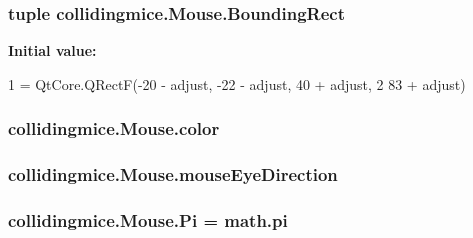 \subsubsection[{Bounding\+Rect}]{\setlength{\rightskip}{0pt plus 5cm}tuple collidingmice.\+Mouse.\+Bounding\+Rect\hspace{0.3cm}{\ttfamily [static]}}\label{classcollidingmice_1_1Mouse_aa7a66203fcf02d765499651037215728}
{\bfseries Initial value\+:}
\begin{DoxyCode}
1 = QtCore.QRectF(-20 - adjust, -22 - adjust, 40 + adjust,
2             83 + adjust)
\end{DoxyCode}
\hypertarget{classcollidingmice_1_1Mouse_a837f3deb6f0b6e0c28de82ad4e349003}{}
\subsubsection[{color}]{\setlength{\rightskip}{0pt plus 5cm}collidingmice.\+Mouse.\+color}\label{classcollidingmice_1_1Mouse_a837f3deb6f0b6e0c28de82ad4e349003}
\hypertarget{classcollidingmice_1_1Mouse_af978c1fd2c6083484564990f7ffca06e}{}
\subsubsection[{mouse\+Eye\+Direction}]{\setlength{\rightskip}{0pt plus 5cm}collidingmice.\+Mouse.\+mouse\+Eye\+Direction}\label{classcollidingmice_1_1Mouse_af978c1fd2c6083484564990f7ffca06e}
\hypertarget{classcollidingmice_1_1Mouse_af3679660da00a0a12ce4aad242eb4e66}{}
\subsubsection[{Pi}]{\setlength{\rightskip}{0pt plus 5cm}collidingmice.\+Mouse.\+Pi = math.\+pi\hspace{0.3cm}{\ttfamily [static]}}\label{classcollidingmice_1_1Mouse_af3679660da00a0a12ce4aad242eb4e66}
\hypertarget{classcollidingmice_1_1Mouse_a0222c861dbe38170b2dde1561d27cbe8}{}
